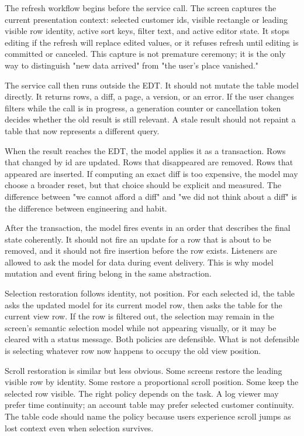 The refresh workflow begins before the service call. The screen captures the current presentation context: selected customer ids, visible rectangle or leading visible row identity, active sort keys, filter text, and active editor state. It stops editing if the refresh will replace edited values, or it refuses refresh until editing is committed or canceled. This capture is not premature ceremony; it is the only way to distinguish "new data arrived" from "the user's place vanished."

The service call then runs outside the EDT. It should not mutate the table model directly. It returns rows, a diff, a page, a version, or an error. If the user changes filters while the call is in progress, a generation counter or cancellation token decides whether the old result is still relevant. A stale result should not repaint a table that now represents a different query.

When the result reaches the EDT, the model applies it as a transaction. Rows that changed by id are updated. Rows that disappeared are removed. Rows that appeared are inserted. If computing an exact diff is too expensive, the model may choose a broader reset, but that choice should be explicit and measured. The difference between "we cannot afford a diff" and "we did not think about a diff" is the difference between engineering and habit.

After the transaction, the model fires events in an order that describes the final state coherently. It should not fire an update for a row that is about to be removed, and it should not fire insertion before the row exists. Listeners are allowed to ask the model for data during event delivery. This is why model mutation and event firing belong in the same abstraction.

Selection restoration follows identity, not position. For each selected id, the table asks the updated model for its current model row, then asks the table for the current view row. If the row is filtered out, the selection may remain in the screen's semantic selection model while not appearing visually, or it may be cleared with a status message. Both policies are defensible. What is not defensible is selecting whatever row now happens to occupy the old view position.

Scroll restoration is similar but less obvious. Some screens restore the leading visible row by identity. Some restore a proportional scroll position. Some keep the selected row visible. The right policy depends on the task. A log viewer may prefer time continuity; an account table may prefer selected customer continuity. The table code should name the policy because users experience scroll jumps as lost context even when selection survives.

